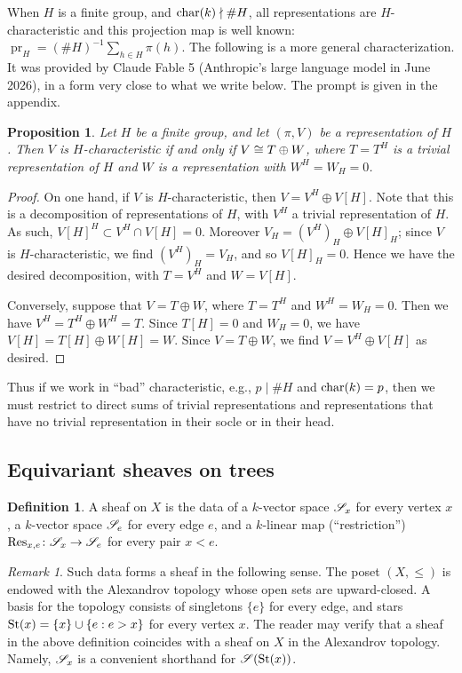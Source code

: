 \documentclass[letter]{amsart}
\newtheorem{proposition}[thm]{Proposition}
\theoremstyle{definition}
\newtheorem{definition}[thm]{Definition}
\theoremstyle{remark}
\newtheorem{remark}[thm]{Remark}
\numberwithin{thm}{section}
\numberwithin{equation}{section}
\DeclareMathOperator{\pr}{pr}
\begin{document}
When $H$ is a finite group, and $\operatorname{char}(k) \nmid \# H$, all representations are $H$-characteristic and this projection map is well known: $\pr_H = (\# H)^{-1} \sum_{h \in H} \pi(h)$.  The following is a more general characterization.  It was provided by Claude Fable 5 (Anthropic's large language model in June 2026), in a form very close to what we write below.  The prompt is given in the appendix.
\begin{proposition}
\label{charchar}
Let $H$ be a finite group, and let $(\pi, V)$ be a representation of $H$.  Then $V$ is $H$-characteristic if and only if $V \cong T \oplus W$, where $T = T^H$ is a trivial representation of $H$ and $W$ is a representation with $W^H = W_H = 0$.
\end{proposition}
\begin{proof}
On one hand, if $V$ is $H$-characteristic, then $V = V^H \oplus V[H]$.  Note that this is a decomposition of representations of $H$, with $V^H$ a trivial representation of $H$.  As such, $V[H]^H \subset V^H \cap V[H] = 0$.  Moreover $V_H = (V^H)_H \oplus V[H]_H$; since $V$ is $H$-characteristic, we find $(V^H)_H = V_H$, and so $V[H]_H = 0$.  Hence we have the desired decomposition, with $T = V^H$ and $W = V[H]$.

Conversely, suppose that $V = T \oplus W$, where $T = T^H$ and $W^H = W_H = 0$.  Then we have $V^H = T^H \oplus W^H = T$.  Since $T[H] = 0$ and $W_H = 0$, we have $V[H] = T[H] \oplus W[H] = W$.  Since $V = T \oplus W$, we find $V = V^H \oplus V[H]$ as desired.
\end{proof}
Thus if we work in ``bad'' characteristic, e.g., $p \mid \#H$ and $\operatorname{char}(k) = p$, then we must restrict to direct sums of trivial representations and representations that have no trivial representation in their socle or in their head.  


\subsection{Equivariant sheaves on trees}

\begin{definition}
A sheaf on $X$ is the data of a $k$-vector space ${\mathscr{S}}_x$ for every vertex $x$, a $k$-vector space ${\mathscr{S}}_e$ for every edge $e$, and a $k$-linear map (``restriction'') $\operatorname{Res}_{x,e} \colon {\mathscr{S}}_x \rightarrow {\mathscr{S}}_e$ for every pair $x < e$.  
\end{definition}

\begin{remark}
Such data forms a sheaf in the following sense.  The poset $(X, \leq)$ is endowed with the Alexandrov topology whose open sets are upward-closed.  A basis for the topology consists of singletons $\{ e \}$ for every edge, and stars $\operatorname{{St}}(x) = \{ x \} \cup \{ e : e > x \}$ for every vertex $x$.  The reader may verify that a sheaf in the above definition coincides with a sheaf on $X$ in the Alexandrov topology.  Namely, ${\mathscr{S}}_x$ is a convenient shorthand for ${\mathscr{S}}(\operatorname{{St}}(x))$.  
\end{remark}
\end{document}
